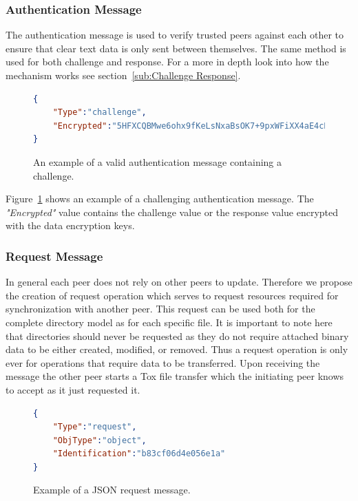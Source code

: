 \subsubsection{Authentication Message}
\label{subs:Authentication Message}

The authentication message is used to verify trusted peers against each other to ensure that clear text data is only sent between themselves.
The same method is used for both challenge and response.
For a more in depth look into how the mechanism works see section~\ref{sub:Challenge Response}.

\begin{figure}[htp]
    \begin{lstlisting}[language=json,firstnumber=0]
{
    "Type":"challenge",
    "Encrypted":"5HFXCQBMwe6ohx9fKeLsNxaBsOK7+9pxWFiXX4aE4cRtdt8oUOHQBJ6XrowiwwgLunM="
}
    \end{lstlisting}
\caption[Authentication Message]{An example of a valid authentication message containing a challenge.}
\label{json:authentication_message}
\end{figure}

Figure~\ref{json:authentication_message} shows an example of a challenging authentication message.
The \textit{"Encrypted"} value contains the challenge value or the response value encrypted with the data encryption keys.

\subsubsection{Request Message}
\label{subs:Request Message}

In general each peer does not rely on other peers to update.
Therefore we propose the creation of request operation which serves to request resources required for synchronization with another peer.
This request can be used both for the complete directory model as for each specific file.
It is important to note here that directories should never be requested as they do not require attached binary data to be either created, modified, or removed.
Thus a request operation is only ever for operations that require data to be transferred.
Upon receiving the message the other peer starts a Tox file transfer which the initiating peer knows to accept as it just requested it.

\begin{figure}[htp]
    \begin{lstlisting}[language=json,firstnumber=0]
{
    "Type":"request",
    "ObjType":"object",
    "Identification":"b83cf06d4e056e1a"
}
    \end{lstlisting}
\caption[Request Message]{Example of a JSON request message.}
\label{json:request_message}
\end{figure}

